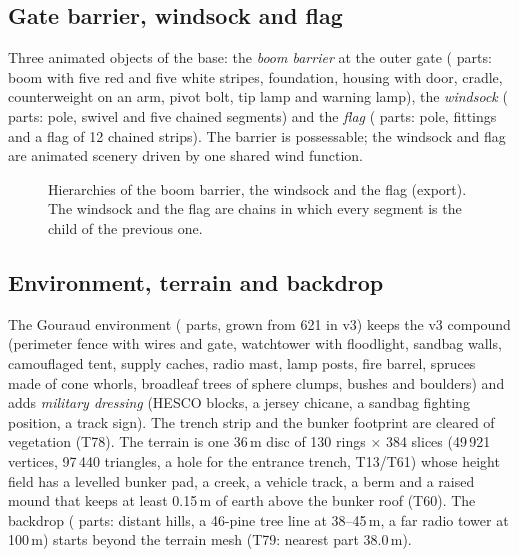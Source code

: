 \subsection{Gate barrier, windsock and flag}
Three animated objects of the base: the \emph{boom barrier} at the outer gate (\partsBarrier{} parts: boom with five red and five white stripes,
foundation, housing with door, cradle, counterweight on an arm, pivot bolt, tip lamp and warning lamp), the \emph{windsock} (\partsWindsock{} parts: pole, swivel and five chained
segments) and the \emph{flag} (\partsFlag{} parts: pole, fittings and a flag of 12 chained strips). The barrier is possessable; the windsock and flag are animated scenery driven by one shared
wind function.

\begin{figure}[h]
\centering
\begin{minipage}[t]{0.32\linewidth}\vspace{0pt}\end{minipage}\hfill
\begin{minipage}[t]{0.32\linewidth}\vspace{0pt}\end{minipage}\hfill
\begin{minipage}[t]{0.32\linewidth}\vspace{0pt}\end{minipage}
\caption{Hierarchies of the boom barrier, the windsock and the flag (export). The windsock and the flag are chains in
which every segment is the child of the previous one.}
\end{figure}

\subsection{Environment, terrain and backdrop}
The Gouraud environment (\partsEnv{} parts, grown from 621 in v3) keeps the v3 compound (perimeter fence with wires and gate,
watchtower with floodlight, sandbag walls, camouflaged tent, supply caches, radio mast, lamp posts, fire barrel,
spruces made of cone whorls, broadleaf trees of sphere clumps, bushes and boulders) and adds \emph{military dressing}
(HESCO blocks, a jersey chicane, a sandbag fighting position, a track sign). The trench strip and the bunker
footprint are cleared of vegetation (T78). The terrain is one 36\,m disc of 130 rings $\times$ 384 slices (49\,921
vertices, 97\,440 triangles, a hole for the entrance trench, T13/T61) whose height field has a levelled bunker pad,
a creek, a vehicle track, a berm and a raised mound that keeps at least 0.15\,m of earth above the bunker roof (T60). The backdrop (\partsBackdrop{} parts:
distant hills, a 46-pine tree line at 38--45\,m, a far radio tower at 100\,m) starts beyond the terrain mesh (T79:
nearest part 38.0\,m).

